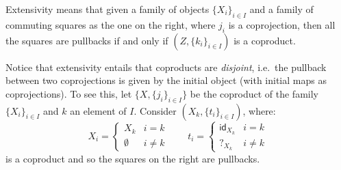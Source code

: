 \documentclass[3p]{elsarticle}
\def\X{\textbf {\textup{X}}}
\newcommand{\id}[1]{\mathsf{id}_{#1}}
\theoremstyle{remark}
\theoremstyle{definition}
\begin{document}
\noindent 
\begin{minipage}[l]{.83\linewidth}
	\setlength{\parindent}{1.5em}
Extensivity means that given a family of objects $\{X_{i}\}_{i\in I}$ and a family of commuting squares as the one on the right, where $j_i$ is a  coprojection, then all the squares are pullbacks if and only if $(Z, \{k_i\}_{i\in I})$ is a coproduct.
\end{minipage}\hfill
\begin{minipage}[r]{.2\linewidth}
\end{minipage}

\noindent
\begin{minipage}[l]{.83\linewidth}
	\setlength{\parindent}{1.5em}
\begin{rem}\label{rem:disj}
	Notice that extensivity entails that coproducts are \emph{disjoint}, i.e.~the pullback between two coprojections is given by the initial object (with initial maps as coprojections). To see this, let $\{X, \{j_i\}_{i\in I}\}$ be the coproduct of the family $\{X_i\}_{i\in I}$ and $k$ an element of $I$. Consider $(X_k, \{t_i\}_{i\in I})$, where:
	\[X_i=\begin{cases}
		X_k & i=k\\\emptyset  & i\neq k
	\end{cases} \qquad  t_i=\begin{cases}
		\id{X_k} & i=k\\?_{X_k} & i\neq k
	\end{cases}\]
		is a coproduct and so the squares on the right are pullbacks.
	\end{rem}
\end{minipage}\hfill 
\begin{minipage}[r]{.2\linewidth}
	 \xymatrix@R=15pt{X_k \ar[r]^{\id{X}} \ar[d]_{\id{X}}& X_k \ar@{>->}[d]^{j_k}\\X_k \ar@{>->}[r]_{j_k} & X}
\end{minipage}
\parbox{11.5cm}{}\hfill\parbox{2cm}{}
\end{document}
